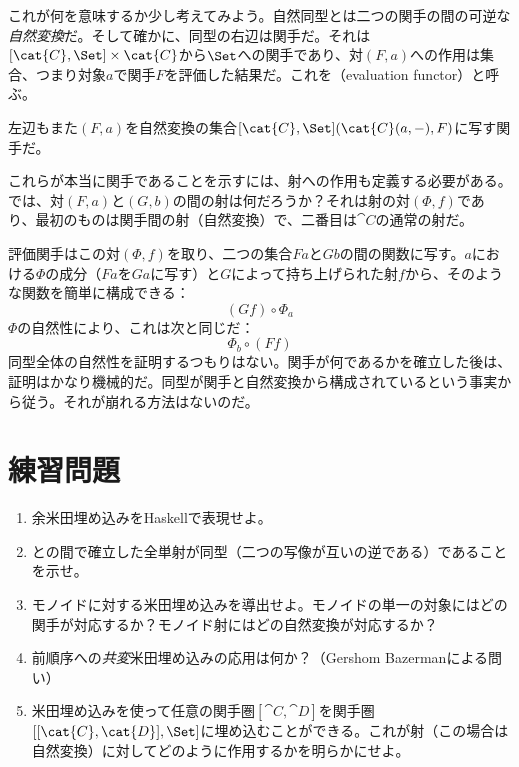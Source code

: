 これが何を意味するか少し考えてみよう。自然同型とは二つの関手の間の可逆な\emph{自然変換}だ。そして確かに、同型の右辺は関手だ。それは$[\cat{C}, \Set] \times \cat{C}$から$\Set$への関手であり、対$(F, a)$への作用は集合、つまり対象$a$で関手$F$を評価した結果だ。これを（evaluation functor）と呼ぶ。

左辺もまた$(F, a)$を自然変換の集合$[\cat{C}, \Set](\cat{C}(a, -), F)$に写す関手だ。

これらが本当に関手であることを示すには、射への作用も定義する必要がある。では、対$(F, a)$と$(G, b)$の間の射は何だろうか？それは射の対$(\Phi, f)$であり、最初のものは関手間の射（自然変換）で、二番目は$\cat{C}$の通常の射だ。

評価関手はこの対$(\Phi, f)$を取り、二つの集合$F a$と$G b$の間の関数に写す。$a$における$\Phi$の成分（$F a$を$G a$に写す）と$G$によって持ち上げられた射$f$から、そのような関数を簡単に構成できる：
\[(G f) \circ \Phi_a\]
$\Phi$の自然性により、これは次と同じだ：
\[\Phi_b \circ (F f)\]
同型全体の自然性を証明するつもりはない。関手が何であるかを確立した後は、証明はかなり機械的だ。同型が関手と自然変換から構成されているという事実から従う。それが崩れる方法はないのだ。

\section{練習問題}

\begin{enumerate}
  \tightlist
  \item
        余米田埋め込みをHaskellで表現せよ。
  \item
        との間で確立した全単射が同型（二つの写像が互いの逆である）であることを示せ。
  \item
        モノイドに対する米田埋め込みを導出せよ。モノイドの単一の対象にはどの関手が対応するか？モノイド射にはどの自然変換が対応するか？
  \item
        前順序への\emph{共変}米田埋め込みの応用は何か？（Gershom Bazermanによる問い）
  \item
        米田埋め込みを使って任意の関手圏$[\cat{C}, \cat{D}]$を関手圏$[[\cat{C}, \cat{D}], \Set]$に埋め込むことができる。これが射（この場合は自然変換）に対してどのように作用するかを明らかにせよ。
\end{enumerate}
